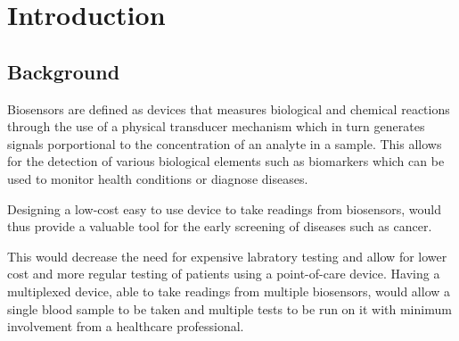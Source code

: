 \graphicspath{{introduction/fig/}}

\chapter{Introduction}
\label{chap:introduction}

\section{Background}

Biosensors are defined as devices that measures biological and chemical reactions through the use of a physical transducer 
mechanism which in turn generates signals porportional to the concentration of an analyte in a sample.\cite{bhallaIntroductionBiosensors2016} This allows for the detection of various biological elements such as biomarkers which can be used to monitor health conditions or diagnose diseases.

Designing a low-cost easy to use device to take readings from biosensors, would thus provide a valuable tool for the early screening of diseases such as cancer. 

This would decrease the need for expensive labratory testing and allow for lower cost and more regular testing of patients using a point-of-care device.
Having a multiplexed device, able to take readings from multiple biosensors, would allow a single blood sample to be taken and multiple tests to be run on it with minimum involvement from a healthcare professional.

